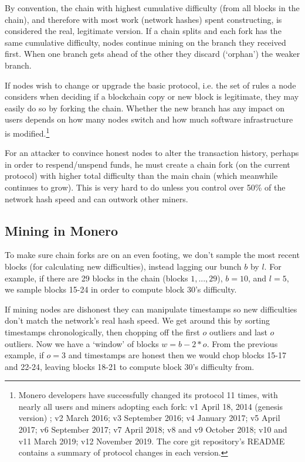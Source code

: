 By convention, the chain with highest cumulative difficulty (from all blocks in the chain), and therefore with most work (network hashes) spent constructing, is considered the real, legitimate version. If a chain splits and each fork has the same cumulative difficulty, nodes continue mining on the branch they received first. When one branch gets ahead of the other they discard (`orphan') the weaker branch.%

If nodes wish to change or upgrade the basic protocol, i.e. the set of rules a node considers when deciding if a blockchain copy or new block is legitimate, they may easily do so by forking the chain. Whether the new branch has any impact on users depends on how many nodes switch and how much software infrastructure is modified.\footnote{Monero developers have successfully changed its protocol 11 times, with nearly all users and miners adopting each fork: v1 April 18, 2014 (genesis version) \cite{bitmonero-launched}; v2 March 2016; v3 September 2016; v4 January 2017; v5 April 2017; v6 September 2017; v7 April 2018; v8 and v9 October 2018; v10 and v11 March 2019; v12 November 2019. The core git repository's README contains a summary of protocol changes in each version.}

For an attacker to convince honest nodes to alter the transaction history, perhaps in order to respend/unspend funds, he must create a chain fork (on the current protocol) with higher total difficulty than the main chain (which meanwhile continues to grow). This is very hard to do unless you control over 50\% of the network hash speed and can outwork other miners. \cite{Nakamoto_bitcoin}


\subsection{Mining in Monero} %

To make sure chain forks are on an even footing, we don't sample the most recent blocks (for calculating new difficulties), instead lagging our bunch $b$ by $l$. For example, if there are 29 blocks in the chain (blocks $1,...,29$), $b = 10$, and $l = 5$, we sample blocks 15-24 in order to compute block 30's difficulty.

If mining nodes are dishonest they can manipulate timestamps so new difficulties don't match the network's real hash speed. We get around this by sorting timestamps chronologically, then chopping off the first $o$ outliers and last $o$ outliers. Now we have a `window' of blocks $w = b-2*o$. From the previous example, if $o = 3$ and timestamps are honest then we would chop blocks 15-17 and 22-24, leaving blocks 18-21 to compute block 30's difficulty from.

